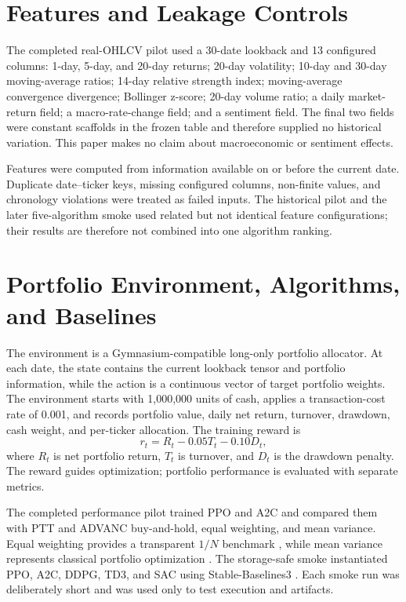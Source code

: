 \documentclass[12pt,a4paper,oneside]{book}
\begin{document}
\section{Features and Leakage Controls}

The completed real-OHLCV pilot used a 30-date lookback and 13 configured columns: 1-day, 5-day, and 20-day returns; 20-day volatility; 10-day and 30-day moving-average ratios; 14-day relative strength index; moving-average convergence divergence; Bollinger z-score; 20-day volume ratio; a daily market-return field; a macro-rate-change field; and a sentiment field. The final two fields were constant scaffolds in the frozen table and therefore supplied no historical variation. This paper makes no claim about macroeconomic or sentiment effects.

Features were computed from information available on or before the current date. Duplicate date--ticker keys, missing configured columns, non-finite values, and chronology violations were treated as failed inputs. The historical pilot and the later five-algorithm smoke used related but not identical feature configurations; their results are therefore not combined into one algorithm ranking.

\section{Portfolio Environment, Algorithms, and Baselines}

The environment is a Gymnasium-compatible long-only portfolio allocator. At each date, the state contains the current lookback tensor and portfolio information, while the action is a continuous vector of target portfolio weights. The environment starts with 1,000,000 units of cash, applies a transaction-cost rate of 0.001, and records portfolio value, daily net return, turnover, drawdown, cash weight, and per-ticker allocation. The training reward is
\begin{equation}
  r_t = R_t - 0.05T_t - 0.10D_t,
  \label{eq:reward}
\end{equation}
where $R_t$ is net portfolio return, $T_t$ is turnover, and $D_t$ is the drawdown penalty. The reward guides optimization; portfolio performance is evaluated with separate metrics.

The completed performance pilot trained PPO and A2C and compared them with PTT and ADVANC buy-and-hold, equal weighting, and mean variance. Equal weighting provides a transparent $1/N$ benchmark \cite{demiguel2009naive}, while mean variance represents classical portfolio optimization \cite{markowitz1952}. The storage-safe smoke instantiated PPO, A2C, DDPG, TD3, and SAC using Stable-Baselines3 \cite{raffin2021sb3}. Each smoke run was deliberately short and was used only to test execution and artifacts.
\end{document}
